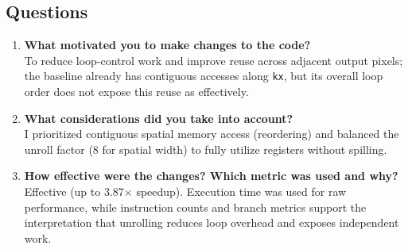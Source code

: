 \subsection{Questions}
\begin{enumerate}
    \item \textbf{What motivated you to make changes to the code?} \\
    To reduce loop-control work and improve reuse across adjacent output pixels; the baseline already has contiguous accesses along \texttt{kx}, but its overall loop order does not expose this reuse as effectively.
    \item \textbf{What considerations did you take into account?} \\
    I prioritized contiguous spatial memory access (reordering) and balanced the unroll factor (8 for spatial width) to fully utilize registers without spilling.
    \item \textbf{How effective were the changes? Which metric was used and why?} \\
    Effective (up to 3.87$\times$ speedup). Execution time was used for raw performance, while instruction counts and branch metrics support the interpretation that unrolling reduces loop overhead and exposes independent work.
\end{enumerate}
